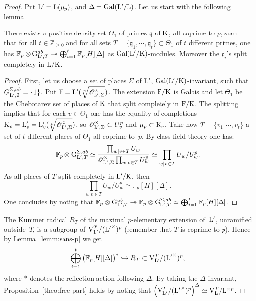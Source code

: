 \documentclass[12pt,a4paper,twoside,english]{smfart}
\def\Z{{\mathbb Z}}
\def\fq{{\mathbb F}}
\def\q{{\mathfrak q}}
\def\G{{\rm G}}
\def\K{{\rm K}}
\def\L{{\rm L}}
\def\F{{\rm F}}
\def\V{{\rm V}}
\def\Gg{{\rm G}}
\def\O{{\mathcal O}}
\def\Gal{{\rm Gal}}
\begin{document}
\begin{proof} Put $\L'=\L(\mu_p)$, and  $\Delta=\Gal(\L'/\L)$.  
Let us start with the following lemma 

\begin{lemm} \label{lemm:sans-p} 
There exists a positive density set $\Theta_1$ of primes $\q$ of $\K$, all coprime to  $p$, such that for all $t \in \Z_{\geq 0}$  and for all sets
 $T=\{\q_1,\cdots, \q_t \} \subset \Theta_1$ of $t$ different primes, one has  $ \fq_p\otimes \G_{\L',T}^{ab} \twoheadrightarrow  \bigoplus_{i=1}^t \fq_p[H][\Delta]$ as $\Gal(\L'/\K)$-modules.
Moreover the $\q_i$'s split completely in $\L/\K$.
\end{lemm} 




\begin{proof}   First, let us choose  a set of places $\Sigma$ of $\L'$, $\Gal(\L'/\K)$-invariant,  such that $G_{\L',\emptyset}^{\Sigma,ab}=\{1\}$.
Put $\F=\L'(\sqrt[p]{\O_{\L',\Sigma}^\times})$.  The extension $\F/\K$ is Galois and  let $\Theta_1$ be the 
 Chebotarev   
set of places of  $\K$ that split completely in $\F/\K$. The splitting implies that for  each $v \in \Theta_1$ one has 
 the equality of completions
$\K_v=\L'_v=\L'_v(\sqrt[p]{\O_{\L',\Sigma}^\times})$, so  $\O_{\L',\Sigma}^{\times} \subset U_v^p$ and $\mu_p \subset \K_v$.
Take now   $T=\{v_1,\cdots, v_t\}$ a set of $t$ different places of $\Theta_1$  all coprime to~$p$. By class field theory one 
has: $$\fq_p\otimes \Gg_{\L',T}^{\Sigma,ab} \simeq \dfrac{\prod_{w|v\in T} U_w}{\O_{\L',\Sigma}^{\times} \prod_{w|v\in T} U_w^p} \simeq \prod_{w|v\in T} U_w/U_w^p.$$
As all places of  $T$ split completely  in $\L'/\K$, then $$\prod_{w|v \in T} U_w/U_w^p \simeq \fq_p[H][\Delta].$$ 
One concludes by noting that  $\fq_p\otimes \G_{\L',T}^{ab} \twoheadrightarrow \fq_p\otimes \Gg_{\L',T}^{\Sigma,ab}\simeq \bigoplus_{i=1}^t \fq_p[H][\Delta]$.
\end{proof}


The Kummer radical $R_T$ of the maximal $p$-elementary extension of~$\L'$, unramified outside~$T$, is a subgroup of $\V_{\L'}^T/({\L'}^\times)^p$ (remember that $T$ is coprime to $p$). Hence by Lemma~\ref{lemm:sans-p} we get
$$\bigoplus_{i=1}^t \big(\fq_p[H][\Delta]\big)^*  \hookrightarrow R_T \subset \V_{\L'}^T/({\L'}^\times)^p,$$
where $*$ denotes the reflection action following $\Delta$. By taking the $\Delta$-invariant, 
Proposition~\ref{theo:free-part} holds by noting that $\left(\V_{\L'}^T/({\L'}^\times)^p\right)^\Delta \simeq \V_{\L}^T/{\L}^{\times p}$.
\end{proof}
\end{document}
